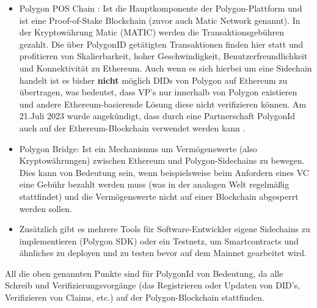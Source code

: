 \begin{itemize}
	\item Polygon POS Chain \label{PolygonPOS} \cite{ID36}: Ist die Hauptkomponente der Polygon-Plattform und ist eine Proof-of-Stake Blockchain (zuvor auch Matic Network genannt). In der Kryptowährung Matic (MATIC) werden die Transaktionsgebühren gezahlt. Die über PolygonID getätigten Transaktionen finden hier statt und profitieren von Skalierbarkeit, hoher Geschwindigkeit, Benutzerfreundlichkeit und Konnektivität zu Ethereum. Auch wenn es sich hierbei um eine Sidechain handelt ist es bisher \textbf{nicht} möglich DIDs von Polygon auf Ethereum zu übertragen, was bedeutet, dass VP's nur innerhalb von Polygon existieren und andere Ethereum-basierende Lösung diese nicht verifizieren können. Am 21.Juli 2023 wurde angekündigt, dass durch eine Partnerschaft PolygonId auch auf der Ethereum-Blockchain verwendet werden kann \cite{ID36}.
	\item Polygon Bridge: Ist ein Mechanismus um Vermögenswerte (also Kryptowährungen) zwischen Ethereum und Polygon-Sidechains zu bewegen. Dies kann von Bedeutung sein, wenn beispielsweise beim Anfordern eines VC eine Gebühr bezahlt werden muss (was in der analogen Welt regelmäßig stattfindet) und die Vermögenswerte nicht auf einer Blockchain abgesperrt werden sollen.
	\item Zusätzlich gibt es mehrere Tools für Software-Entwickler eigene Sidechains zu implementieren (Polygon SDK) oder ein Testnetz, um Smartcontracts und ähnliches zu deployen und zu testen bevor auf dem Mainnet gearbeitet wird.
	
\end{itemize}
All die oben genannten Punkte sind für PolygonId von Bedeutung, da alle Schreib und Verifizierungsvorgänge (das Registrieren oder Updaten von DID's, Verifizieren von Claims, etc.) auf der Polygon-Blockchain stattfinden. \\

